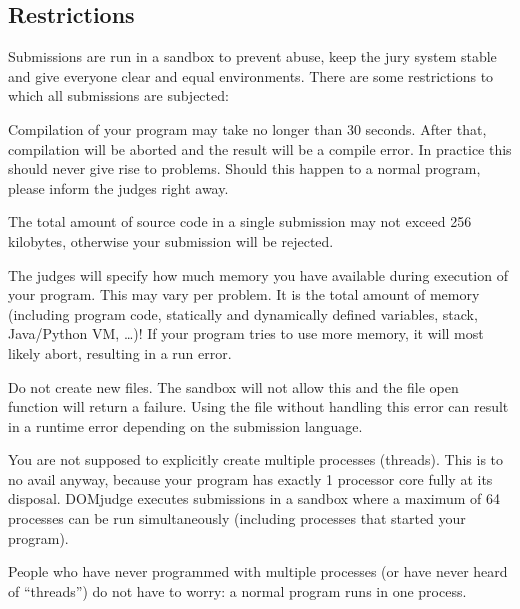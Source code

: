 \documentclass[a4paper,10pt,english,openany]{sphinxmanual}
\begin{document}
\subsection{Restrictions}
\label{\detokenize{team:restrictions}}\label{\detokenize{team:runlimits}}
\sphinxAtStartPar
Submissions are run in a sandbox to prevent abuse, keep the jury system
stable and give everyone clear and equal environments. There
are some restrictions to which all submissions are subjected:
\begin{description}
\sphinxAtStartPar
Compilation of your program may take no longer than 30
seconds. After that, compilation will be aborted and the result will
be a compile error. In practice this should never give rise to
problems. Should this happen to a normal program, please inform the
judges right away.

\sphinxAtStartPar
The total amount of source code in a single submission may not exceed
256 kilobytes, otherwise your submission will be rejected.

\sphinxAtStartPar
The judges will specify how much memory you have available during
execution of your program. This may vary per problem. It is the
total amount of memory (including program code, statically and
dynamically defined variables, stack, Java/Python VM, …)!
If your program tries to use more memory, it will most likely abort,
resulting in a run error.

\sphinxAtStartPar
Do not create new files. The sandbox will not allow this and the file open
function will return a failure. Using the file without handling this error can
result in a runtime error depending on the submission language.

\sphinxAtStartPar
You are not supposed to explicitly create multiple processes (threads). This is
to no avail anyway, because your program has exactly 1 processor core fully
at its disposal. DOMjudge executes submissions in a sandbox where a maximum
of 64 processes can be run simultaneously (including processes that
started your program).

\sphinxAtStartPar
People who have never programmed with multiple processes (or have
never heard of “threads”) do not have to worry: a normal program
runs in one process.

\end{description}
\end{document}
